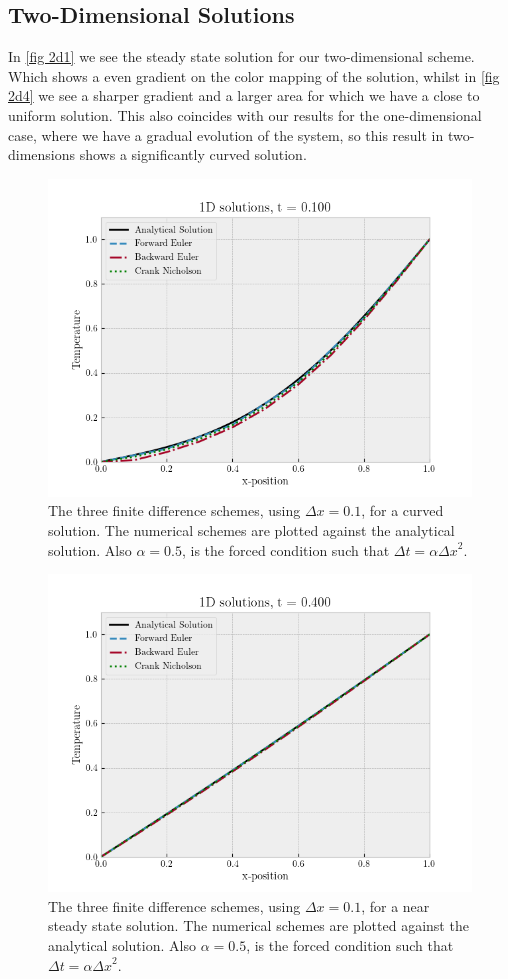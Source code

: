 \documentclass[%
reprint,
nofootinbib,
amsmath,amssymb,
aps,
]{revtex4-1}
\newcommand{\dt}{{\Delta t}}
\newcommand{\dx}{{\Delta x}}
\begin{document}
\subsection{Two-Dimensional Solutions}
In \autoref{fig 2d1} we see the steady state solution for our two-dimensional scheme. Which shows a even gradient on the color mapping of the solution, whilst in \autoref{fig 2d4} we see a sharper gradient and a larger area for which we have a close to uniform solution. This also coincides with our results for the one-dimensional case, where we have a gradual evolution of the system, so this result in two-dimensions shows a significantly curved solution. 

\begin{figure}
	\centering
	\includegraphics[width=0.95\linewidth]{./figures/plot1d0101.png}
	\caption{The three finite difference schemes, using $\dx = 0.1$, for a curved solution. The numerical schemes are plotted against the analytical solution. Also $\alpha = 0.5$, is the forced condition such that $\dt = \alpha\dx^2$.}
	\label{fig plot1d0101}
\end{figure}
\begin{figure}
	\centering
	\includegraphics[width=0.95\linewidth]{./figures/plot1d0401.png}
	\caption{The three finite difference schemes, using $\dx = 0.1$, for a near steady state solution. The numerical schemes are plotted against the analytical solution. Also $\alpha = 0.5$, is the forced condition such that $\dt = \alpha\dx^2$.}
	\label{fig plot1d0401}
\end{figure}
\end{document}
